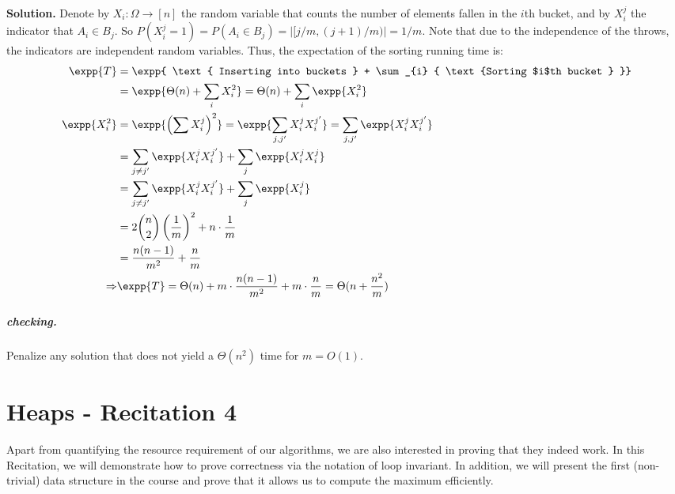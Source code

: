 \ifdefined\SOLUTION
  \textbf{Solution.} Denote by $X_i: \Omega \rightarrow [n]$ the random variable that counts the number of elements fallen in the $i$th bucket, and by $X_i^j$ the indicator that $A_i \in B_j$. So $P(X_i^j = 1) = P(A_i \in B_j) = |[j/m, (j+1)/m)| = 1/m$. Note that due to the independence of the throws, the indicators are independent random variables. Thus, the expectation of the sorting running time is:
  \begin{equation*}
    \begin{split}
    \expp{T} &= \expp{  \text{ Inserting into buckets  }   +   \sum_{i} { \text{Sorting $i$th bucket  } }} \\ 
    & = \expp{ \Theta(n) +   \sum_{i} { X_{i}^{2}  }} = \Theta(n) +  \sum_{i}{ \expp{X_{i}^{2}} }  \\
  \expp{X_{i}^{2}} &= \expp{\left( \sum X_{i}^{j} \right)^{2}} = \expp{\sum_{j,j^{\prime}} X_{i}^{j} X_{i}^{j^{\prime}} } =  \sum_{j, j^{\prime}} \expp{X_{i}^{j} X_{i}^{j^{\prime}}} \\ 
  & = \sum_{j \neq j^{\prime}} \expp{X_{i}^{j} X_{i}^{j^{\prime}}} + \sum_{j} \expp{X_{i}^{j} X_{i}^{j}} \\
    & =  \sum_{j \neq j^{\prime}} \expp{X_{i}^{j} X_{i}^{j^{\prime}}} + \sum_{j} \expp{X_{i}^{j}}  \\
        & = 2 { n \choose 2  } \left( \frac{1}{m} \right)^{2} +  n\cdot \frac{1}{m} \\ 
        & = \frac{n(n-1)}{m^{2}} + \frac{n}{m}  \\
        \Rightarrow & \expp{T} = \Theta(n) +m \cdot \frac{n(n-1)}{m^{2}} + m \cdot \frac{n}{m}  = \Theta(n + \frac{n^{2}}{m})
    \end{split}
  \end{equation*}
\fi
\ifdefined\CHECK
  \paragraph{checking.} Penalize any solution that does not yield a $\Theta(n^{2})$ time for $m=O(1)$.
\fi 
\ifdefined\Book
\fi

\chapter{Heaps - Recitation 4} 
\author{Correctness, Loop Invariant And Heaps.}


  Apart from quantifying the resource requirement of our algorithms, we are also interested in proving that they indeed work. In this Recitation, we will demonstrate how to prove correctness via the notation of loop invariant. In addition, we will present the first (non-trivial) data structure in the course and prove that it allows us to compute the maximum efficiently.

